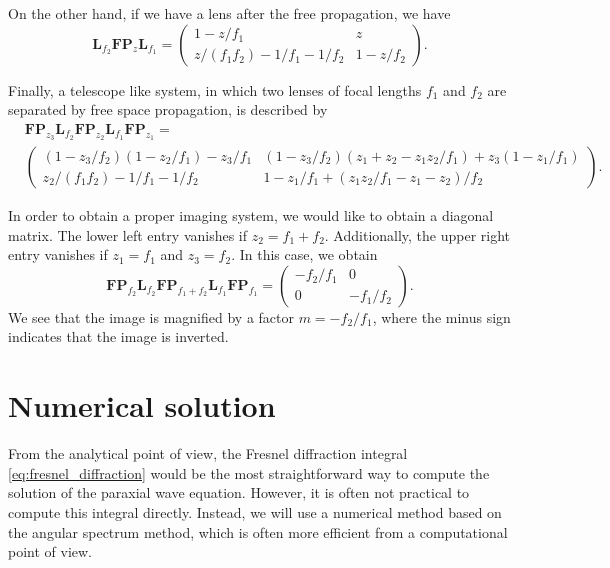 \documentclass[a4paper,10pt]{report}
\begin{document}
On the other hand, if we have a lens after the free propagation, we have
\begin{equation}
    \mathbf{L}_{f_2} \mathbf{FP}_{z} \mathbf{L}_{f_1} = \begin{pmatrix}
        1 - z/f_1 & z \\
        z / (f_1 f_2) - 1/f_1 - 1/f_2 & 1 - z / f_2
    \end{pmatrix} .
\end{equation}

Finally, a telescope like system, in which two lenses of focal lengths $f_1$ and $f_2$ are separated by free space propagation, is described by
\begin{equation}
    \begin{aligned}
        &\mathbf{FP}_{z_3} \mathbf{L}_{f_2} \mathbf{FP}_{z_2} \mathbf{L}_{f_1} \mathbf{FP}_{z_1}  = \\ &\begin{pmatrix}
        (1-z_3/f_2)(1-z_2/f_1) - z_3 / f_1 & (1 - z_3 / f_2)(z_1 + z_2 - z_1 z_2 / f_1) + z_3 (1 - z_1 / f_1) \\
        z_2 / (f_1 f_2) - 1/f_1 - 1/f_2 & 1 - z_1 / f_1 + (z_1 z_2 / f_1 - z_1 - z_2)/f_2
    \end{pmatrix} .
    \end{aligned}
\end{equation}

In order to obtain a proper imaging system, we would like to obtain a diagonal matrix. The lower left entry vanishes if $z_2 = f_1 + f_2$. Additionally, the upper right entry vanishes if $z_1 = f_1$ and $z_3 = f_2$. In this case, we obtain 
\begin{equation}
    \mathbf{FP}_{f_2} \mathbf{L}_{f_2} \mathbf{FP}_{f_1+f_2} \mathbf{L}_{f_1} \mathbf{FP}_{f_1} = \begin{pmatrix}
        -f_2 / f_1 & 0 \\
        0 & -f_1 / f_2
    \end{pmatrix} .
\end{equation}
We see that the image is magnified by a factor $m = -f_2 / f_1$, where the minus sign indicates that the image is inverted.

\chapter{Numerical solution}

From the analytical point of view, the Fresnel diffraction integral \eqref{eq:fresnel_diffraction} would be the most straightforward way to compute the solution of the paraxial wave equation. However, it is often not practical to compute this integral directly. Instead, we will use a numerical method based on the angular spectrum method, which is often more efficient from a computational point of view.
\end{document}
